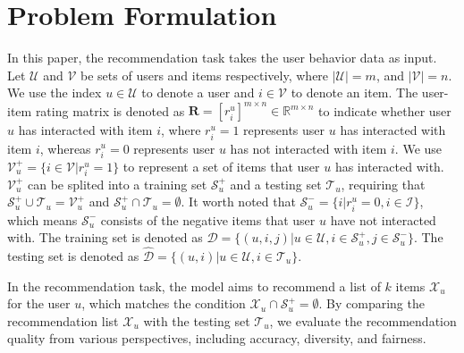 \section{Problem Formulation}
In this paper, the recommendation task takes the user behavior data as input. 
Let $\mathcal{U}$ and $\mathcal{V}$ be sets of users and items respectively, where $|\mathcal{U}|= m$, and $|\mathcal{V}|= n$. We use the index $u \in \mathcal{U}$ to denote a user and $i\in \mathcal{V}$ to denote an item. 
The user-item rating matrix is denoted as $\mathbf{R} = [r_i^u]^{m\times n}\in \mathbb{R}^{m\times n}$ to indicate whether user $u$ has interacted with item $i$, where $r_i^u=1$ represents user $u$ has interacted with item $i$,  whereas $r_i^u=0$ represents user $u$ has not interacted with item $i$. 
We use $\mathcal{V}^{+}_{u}=\{i\in\mathcal{V}|r_i^u=1\}$ to represent a set of items that user $u$ has interacted with.
$\mathcal{V}^{+}_{u}$ can be splited into a training set $\mathcal{S}_{u}^{+}$ and a testing set $\mathcal{T}_{u}$, requiring that $\mathcal{S}_{u}^{+} \cup \mathcal{T}_{u} = \mathcal{V}^{+}_{u}$ and $\mathcal{S}_{u}^{+} \cap \mathcal{T}_{u} = \emptyset$. It worth noted that $\mathcal{S}_u^{-}=\{i|r_i^u=0,i\in \mathcal{I}\}$, which means $\mathcal{S}_u^{-}$ consists of the negative items that user $u$ have not interacted with. The training set is denoted as $\mathcal{D}=\{(u,i, j)|u\in \mathcal{U}, i \in \mathcal{S}_{u}^{+}, j \in \mathcal{S}_{u}^{-}\}$. The testing set is denoted as $\mathcal{\hat{D}}=\{(u,i)|u\in \mathcal{U}, i \in \mathcal{T}_{u}\}$.

In the recommendation task, the model aims to recommend a list of $k$ items $\mathcal{X}_u$ for the user $u$, which matches the condition $\mathcal{X}_u\cap \mathcal{S}_u^{+}=\emptyset$. 
By comparing the recommendation list $\mathcal{X}_u$ with the testing set $\mathcal{T}_u$, we evaluate the recommendation quality from various perspectives, including accuracy, diversity, and fairness. 

